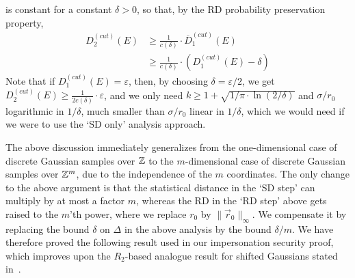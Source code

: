 is constant for a constant $\delta>0$, so that, by the RD probability preservation
property,
\begin{align*}
  D_2^{(cut)}(E) &\geq \frac{1}{c(\delta)} \cdot \overline{D}_1^{(cut)}(E)\\
                 &\geq \frac{1}{c(\delta)} \cdot (D_1^{(cut)}(E) - \delta)
\end{align*}
Note that if $D_1^{(cut)}(E)=\varepsilon$, then, by choosing
$\delta = \varepsilon/2$, we get
$D_2^{(cut)}(E) \geq \frac{1}{2c(\delta)} \cdot \varepsilon$, and we only need
$k \geq 1 + \sqrt{1/\pi \cdot \ln(2/\delta)}$ and $\sigma/r_0$ logarithmic in
$1/\delta$, much smaller than $\sigma/r_0$ linear in $1/\delta$, which we would
need if we were to use the `SD only' analysis approach.

The above discussion immediately generalizes from the one-dimensional case of
discrete Gaussian samples over $\mathbb{Z}$ to the $m$-dimensional case of discrete
Gaussian samples over $\mathbb{Z}^m$, due to the independence of the $m$
coordinates. The only change to the above argument is that the statistical
distance in the `SD step' can multiply by at most a factor $m$, whereas the RD
in the `RD step' above gets raised to the $m$'th power, where we replace $r_0$
by $\|\vec{r}_0\|_{\infty}$. We compensate it by replacing the bound
$\delta$ on $\Delta$ in the above analysis by the bound $\delta/m$. We have
therefore proved the following result used in our impersonation security proof,
which improves upon the $R_2$-based analogue result for shifted Gaussians stated
in~\cite{langlois2014gghlite}.


